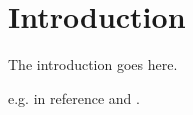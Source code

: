 
\section{Introduction}
\label{sec:Introduction} 

The introduction goes here.

e.g. in reference \cite{R2QCD} and \cite{R2QED}.



